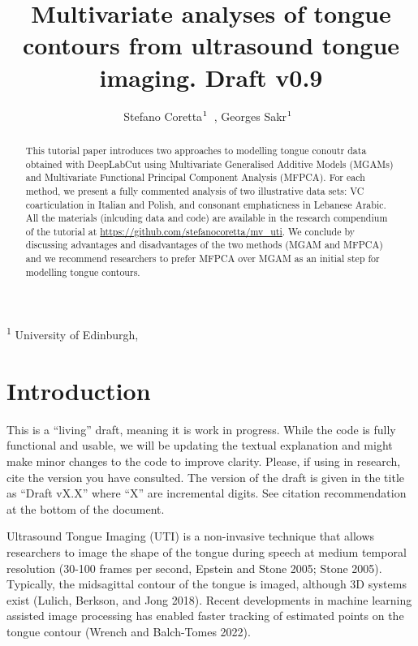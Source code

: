 \documentclass[
]{interact}
\title{Multivariate analyses of tongue contours from ultrasound tongue
imaging. Draft v0.9}
\author{Stefano
Coretta$\textsuperscript{1}$~\orcidlink{0000-0001-9627-5532}, Georges
Sakr$\textsuperscript{1}$~\orcidlink{0000-0003-3813-2669}}
\begin{document}
\captionsetup{labelsep=space}
\maketitle
\textsuperscript{1}  University of Edinburgh,  
\begin{abstract}
This tutorial paper introduces two approaches to modelling tongue
conoutr data obtained with DeepLabCut using Multivariate Generalised
Additive Models (MGAMs) and Multivariate Functional Principal Component
Analysis (MFPCA). For each method, we present a fully commented analysis
of two illustrative data sets: VC coarticulation in Italian and Polish,
and consonant emphaticness in Lebanese Arabic. All the materials
(inlcuding data and code) are available in the research compendium of
the tutorial at \url{https://github.com/stefanocoretta/mv_uti}. We
conclude by discussing advantages and disadvantages of the two methods
(MGAM and MFPCA) and we recommend researchers to prefer MFPCA over MGAM
as an initial step for modelling tongue contours.
\end{abstract}


\section{Introduction}\label{introduction}

\begin{tcolorbox}[enhanced jigsaw, colbacktitle=quarto-callout-warning-color!10!white, opacityback=0, colframe=quarto-callout-warning-color-frame, coltitle=black, colback=white, bottomtitle=1mm, opacitybacktitle=0.6, breakable, toprule=.15mm, titlerule=0mm, bottomrule=.15mm, title=\textcolor{quarto-callout-warning-color}{\faExclamationTriangle}\hspace{0.5em}{Warning}, rightrule=.15mm, arc=.35mm, toptitle=1mm, leftrule=.75mm, left=2mm]

This is a ``living'' draft, meaning it is work in progress. While the
code is fully functional and usable, we will be updating the textual
explanation and might make minor changes to the code to improve clarity.
Please, if using in research, cite the version you have consulted. The
version of the draft is given in the title as ``Draft vX.X'' where ``X''
are incremental digits. See citation recommendation at the bottom of the
document.

\end{tcolorbox}

Ultrasound Tongue Imaging (UTI) is a non-invasive technique that allows
researchers to image the shape of the tongue during speech at medium
temporal resolution (30-100 frames per second, Epstein and Stone 2005;
Stone 2005). Typically, the midsagittal contour of the tongue is imaged,
although 3D systems exist (Lulich, Berkson, and Jong 2018). Recent
developments in machine learning assisted image processing has enabled
faster tracking of estimated points on the tongue contour (Wrench and
Balch-Tomes 2022).
\end{document}
